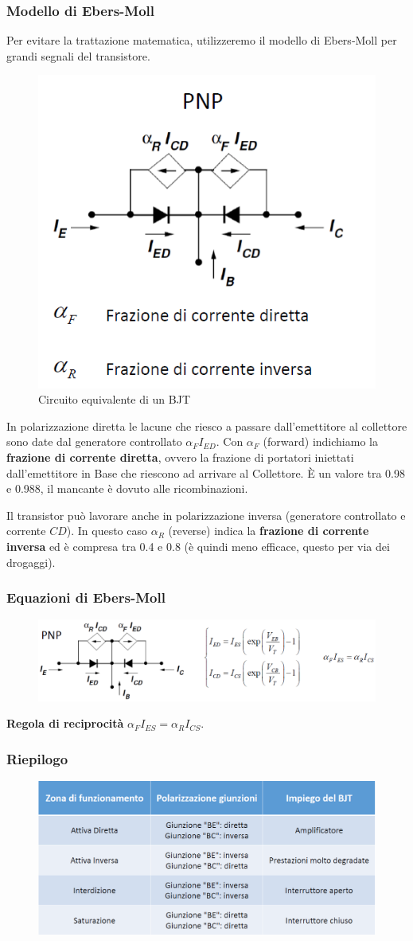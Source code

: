\documentclass[11pt,a4paper,]{article}
\begin{document}
\subsubsection{Modello di Ebers-Moll}
Per evitare la trattazione matematica, utilizzeremo il modello di Ebers‑Moll per grandi segnali del transistore.
\begin{figure}[H]
    \centering
    \includegraphics[width=0.5\linewidth]{img/eb mol.png}
    \caption{Circuito equivalente di un BJT}
\end{figure}
In polarizzazione diretta le lacune che riesco a passare dall'emettitore al collettore sono date dal generatore controllato $\alpha_F I_{ED}$. Con $\alpha_F$ (forward) indichiamo la \textbf{frazione di corrente diretta}, ovvero la frazione di portatori iniettati dall'emettitore in Base che riescono ad arrivare al Collettore.
È un valore tra 0.98 e 0.988, il mancante è dovuto alle ricombinazioni.

Il transistor può lavorare anche in polarizzazione inversa (generatore controllato e corrente $CD$). In questo caso $\alpha_R$ (reverse) indica la \textbf{frazione di corrente inversa} ed è compresa tra 0.4 e 0.8 (è quindi meno efficace, questo per via dei drogaggi).
\subsubsection{Equazioni di Ebers-Moll}
\begin{figure}[H]
    \centering
    \includegraphics[width=0.75\linewidth]{img/eq eb mol.png}
\end{figure}
\textbf{Regola di reciprocità} $\alpha_F I_{ES} = \alpha_R I_{CS}$.
\subsubsection{Riepilogo}
\begin{figure}[H]
    \centering
    \includegraphics[width=0.5\linewidth]{img/recap bjt.png}
\end{figure}
\end{document}
